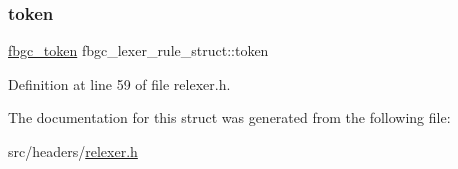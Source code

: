 \mbox{\label{structfbgc__lexer__rule__struct_aaaad14f003c813291b9d121217737b56}} 
\subsubsection{\texorpdfstring{token}{token}}
{\footnotesize\ttfamily \hyperlink{tokens_8h_a9d21ebbf42e602eb0cf502c867d20a7e}{fbgc\+\_\+token} fbgc\+\_\+lexer\+\_\+rule\+\_\+struct\+::token}



Definition at line 59 of file relexer.\+h.



The documentation for this struct was generated from the following file\+:\begin{DoxyCompactItemize}
\item 
src/headers/\hyperlink{relexer_8h}{relexer.\+h}\end{DoxyCompactItemize}
